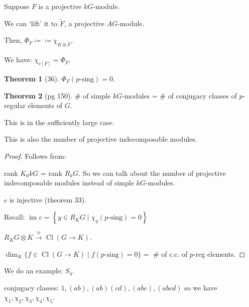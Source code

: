 \documentclass{article}
\theoremstyle{definition}
\newtheorem{theorem}{Theorem}
\begin{document}
\begin{center}
\end{center}

Suppose \(F\) is a projective \(kG\)-module.

We can `lift' it to \(\widetilde{F}\), a projective \(AG\)-module.

Then, \(\Phi_F \coloneqq \coloneqq \chi_{K \otimes_{} \widetilde{F}}\).

We have: \(\chi_{e[F]} = \Phi_F\).

\begin{theorem}
    [36] \(\Phi_F(p \text{-sing}) = 0\). 
\end{theorem}

\begin{theorem}
    [pg 150] \# of simple \(kG\)-modules = \# of conjugacy classes of \(p\)-regular elements of \(G\).

    This is in the sufficiently large case.

    This is also the number of projective indecomposable modules.
\end{theorem}

\begin{proof}
    Follows from:

    rank \(K_0 k G\) = rank \(R_k G\). So we can talk about the number of projective indecomposable modules instead of simple \(kG\)-modules.

    \(e\) is injective (theorem 33).

    Recall: \(\operatorname{im} e = \left\{ y \in R_K G \mid \chi_y (p \text{-sing}) = 0 \right\} \) 

    \(R_K G \otimes K \overset{\cong}{\to} \operatorname{Cl} (G \to K)\).

    \(\dim_K \{ f \in \operatorname{Cl} (G \to K) \mid f(p \text{-sing}) = 0 \} = \) \# of c.c. of \(p\)-reg elements. 
\end{proof}

We do an example: \(S_4\).

conjugacy classes: \(1, (ab), (ab)(cd), (abc), (abcd)\) so we have \(\chi_1, \chi_2, \chi_3, \chi_4, \chi_5\).
\end{document}
